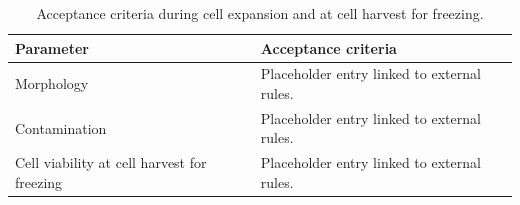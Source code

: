 \begin{table}[h]
    \centering
    \begin{tabular}{p{}  p{}}
        \hline
        \textbf{Parameter} & \textbf{Acceptance criteria} \\ \hline
        Morphology & Placeholder entry linked to external rules. \\
        Contamination & Placeholder entry linked to external rules. \\
        Cell viability at cell harvest for freezing & Placeholder entry linked to external rules. \\
        \hline
    \end{tabular}
    \caption{Acceptance criteria during cell expansion and at cell harvest for freezing.}
    \label{tab:acceptance}
\end{table}
